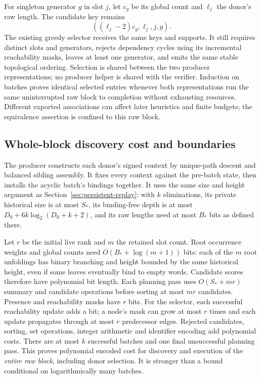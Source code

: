 For singleton generator $g$ in slot $j$, let $c_g$ be its global count and
$\ell_j$ the donor's raw length. The candidate key remains
\[
                 ((\ell_j-2)c_g,\ell_j,j,g).
\]
The existing greedy selector receives the same keys and supports. It still
requires distinct slots and generators, rejects dependency cycles using its
incremental reachability masks, leaves at least one generator, and emits the
same stable topological ordering. Selection is shared between the two producer
representations; no producer helper is shared with the verifier. Induction on
batches proves identical selected entries whenever both representations run
the same uninterrupted raw block to completion without exhausting resources.
Different exported associations can affect later heuristics and finite budgets;
the equivalence assertion is confined to this raw block.

\subsection{Whole-block discovery cost and boundaries}

The producer constructs each donor's signed context by unique-path descent
and balanced sibling assembly. It fixes every context against the pre-batch
state, then installs the acyclic batch's bindings together. It uses the same
size and height argument as Section~\ref{sec:persistent-replay}: with $k$
eliminations, its private historical size is at most $S_*$, its binding-free
depth is at most $D_0+6k\log_2(D_0+k+2)$, and its raw lengths need at most
$B_*$ bits as defined there.

Let $r$ be the initial live rank and $m$ the retained slot count. Root occurrence
weights and global counts need $O(B_*+\log(m+1))$ bits: each of the $m$ root
unfoldings has binary branching and height bounded by the same historical
height, even if some leaves eventually bind to empty words. Candidate scores
therefore have polynomial bit length. Each planning pass uses $O(S_*+mr)$
summary and candidate operations before sorting at most $mr$ candidates.
Presence and reachability masks have $r$ bits. For the selector, each successful
reachability update adds a bit; a node's mask can grow at most $r$ times and
each update propagates through at most $r$ predecessor edges. Rejected
candidates, sorting, set operations, integer arithmetic and identifier encoding
add polynomial costs. There are at most $k$ successful batches and one final
unsuccessful planning pass. This proves polynomial encoded cost for discovery
and execution of the \emph{entire raw block}, including donor selection.
It is stronger than a bound conditional on logarithmically many batches.

